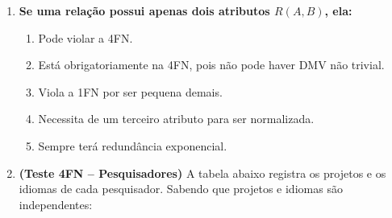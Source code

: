 \documentclass[12pt]{article}
\begin{document}
\begin{enumerate}[label=\textbf{Questão \arabic*:}, leftmargin=*]
  \item \textbf{Se uma relação possui apenas dois atributos $R(A, B)$, ela:}
  \begin{enumerate}[label=\alph*)]
    \item Pode violar a 4FN.
    \item Está obrigatoriamente na 4FN, pois não pode haver DMV não trivial.
    \item Viola a 1FN por ser pequena demais.
    \item Necessita de um terceiro atributo para ser normalizada.
    \item Sempre terá redundância exponencial.
  \end{enumerate}

  \vspace{0.4cm}

  \item \textbf{(Teste 4FN -- Pesquisadores)} A tabela abaixo registra os projetos e os idiomas de cada pesquisador. Sabendo que projetos e idiomas são independentes:
  

\end{enumerate}
\end{document}
